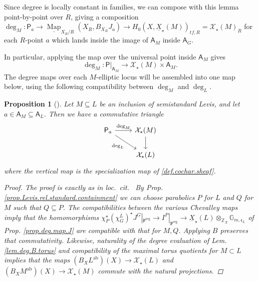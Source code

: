 \documentclass[openany]{amsbook}
\newtheorem{proposition}[theorem]{Proposition}
\theoremstyle{definition}
\theoremstyle{remark}
\numberwithin{equation}{section}
\newcommand{\Z}{\mathbb{Z}}
\newcommand{\G}{\mathbb{G}}
\newcommand{\cX}{\mathcal{X}}
\newcommand{\ul}[1]{\underline{#1}}
\renewcommand{\-}{\operatorname{-}}
\newcommand{\Map}{\ul{\operatorname{Map}}}
\newcommand{\on}[1]{\operatorname{#1}}
\newcommand{\reg}{\on{reg}}
\newcommand{\bA}{\mathsf{A}}
\newcommand{\bP}{\mathsf{P}}
\newcommand{\fc}{\mathfrak{c}}
\newcommand{\fp}{\mathfrak{p}}
\newcommand{\tf}{\mathit{tf}}
\newcommand{\ab}{\mathrm{ab}}
\begin{document}
Since degree is locally constant in families, we can compose with this lemma point-by-point over $R$, giving a composition $\deg_M : \bP_a \to \Map_{X_R/R}(X_R, B_{X_R} J_a) \to H_0(X, \ul{X}_\star(M))_{\tf, R} = \cX_\star(M)_R$ for each $R$-point $a$ which lands inside the image of $\bA_M$ inside $\bA_G$.

In particular, applying the map over the universal point inside $\bA_{M}$ gives
\begin{equation}
    \deg_M : \bP|_{\bA_M} \to \cX_\star(M) \times \bA_{M}. \label{eqn.deg.M.Pic}
\end{equation}
The degree maps over each $M$-elliptic locus will be assembled into one map below, using the following compatibility between $\deg_M$ and $\deg_L$.

\begin{proposition}[{{\cite[Prop.\ 5.3.1]{CLII}}}]\label{prop.deg.Pic.compat}
    Let $M \subseteq L$ be an inclusion of semistandard Levis, and let $a \in \bA_M \subseteq \bA_L$. Then we have a commutative triangle
    $$
        \begin{tikzcd}[ampersand replacement=\&]
            \bP_a \ar[r, "\deg_M" above] \ar[dr, "\deg_L" below left] \& \cX_\star(M) \ar[d] \\
            \& \cX_\star(L)
        \end{tikzcd}
    $$
    where the vertical map is the specialization map of \ref{def.cochar.sheaf}.
\begin{proof}
    The proof is exactly as in \textit{loc.\ cit.\ } By Prop. \ref{prop.Levis.rel.standard.containment} we can choose parabolics $P$ for $L$ and $Q$ for $M$ such that $Q \subseteq P$. The compatibilities between the various Chevalley maps imply that the homomorphisms $\chi_P^\star (\chi^L_G)^\star J^G|_{\fp^{\reg}} \to I^P|_{\fp^{\reg}} \to \ul{X}_\star(L) \otimes_{\Z_X} \G_{m, \fc_L}$ of Prop. \ref{prop.deg.map.J} are compatible with that for $M,Q$. Applying $B$ preserves that commutativity. Likewise, naturality of the degree evaluation of Lem. \ref{lem.deg.B.torus} and compatibility of the maximal torus quotients for $M \subset L$ implies that the maps $(B_X L^{\ab})(X) \to \cX_\star(L)$ and $(B_X M^{\ab})(X) \to \cX_\star(M)$ commute with the natural projections. 
\end{proof}
\end{proposition}
\end{document}
